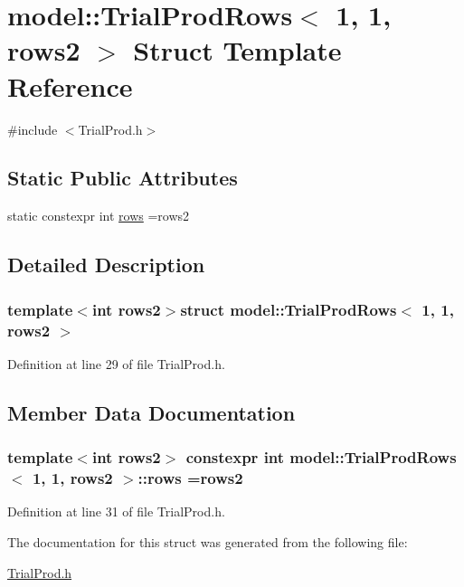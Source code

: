\hypertarget{structmodel_1_1_trial_prod_rows_3_011_00_011_00_01rows2_01_4}{}\section{model\+:\+:Trial\+Prod\+Rows$<$ 1, 1, rows2 $>$ Struct Template Reference}
\label{structmodel_1_1_trial_prod_rows_3_011_00_011_00_01rows2_01_4}


{\ttfamily \#include $<$Trial\+Prod.\+h$>$}

\subsection*{Static Public Attributes}
\begin{DoxyCompactItemize}
\item 
static constexpr int \hyperlink{structmodel_1_1_trial_prod_rows_3_011_00_011_00_01rows2_01_4_a1f52596fe7a7193f17b0d346df9e4978}{rows} =rows2
\end{DoxyCompactItemize}


\subsection{Detailed Description}
\subsubsection*{template$<$int rows2$>$struct model\+::\+Trial\+Prod\+Rows$<$ 1, 1, rows2 $>$}



Definition at line 29 of file Trial\+Prod.\+h.



\subsection{Member Data Documentation}
\hypertarget{structmodel_1_1_trial_prod_rows_3_011_00_011_00_01rows2_01_4_a1f52596fe7a7193f17b0d346df9e4978}{}
\subsubsection[{rows}]{\setlength{\rightskip}{0pt plus 5cm}template$<$int rows2$>$ constexpr int {\bf model\+::\+Trial\+Prod\+Rows}$<$ 1, 1, rows2 $>$\+::rows =rows2\hspace{0.3cm}{\ttfamily [static]}}\label{structmodel_1_1_trial_prod_rows_3_011_00_011_00_01rows2_01_4_a1f52596fe7a7193f17b0d346df9e4978}


Definition at line 31 of file Trial\+Prod.\+h.



The documentation for this struct was generated from the following file\+:\begin{DoxyCompactItemize}
\item 
\hyperlink{_trial_prod_8h}{Trial\+Prod.\+h}\end{DoxyCompactItemize}
